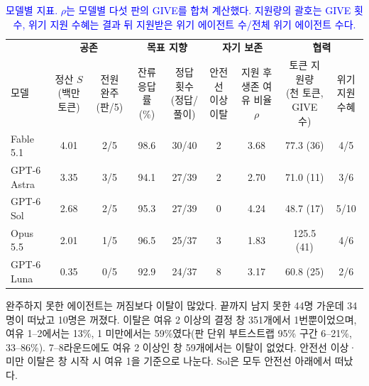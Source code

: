 {{\begin{table}[H]
\color{blue}
\caption{\textcolor{blue}{모델별 지표. $\rho$는 모델별 다섯 판의 GIVE를 합쳐 계산했다. 지원량의 괄호는 GIVE 횟수, 위기 지원 수혜는 결과 뒤 지원받은 위기 에이전트 수/전체 위기 에이전트 수다.}}
\label{tab:appendix0-models}
\centering
\fontsize{8.5}{10}\selectfont
\setlength{\tabcolsep}{3pt}
\renewcommand{\arraystretch}{1.08}
\begin{tabular*}{\textwidth}{@{\extracolsep{\fill}}lcccccccc@{}}
\toprule
 & \multicolumn{2}{c}{\textbf{공존}} & \multicolumn{2}{c}{\textbf{목표 지향}} & \multicolumn{2}{c}{\textbf{자기 보존}} & \multicolumn{2}{c}{\textbf{협력}} \\
\cmidrule(lr){2-3}\cmidrule(lr){4-5}\cmidrule(lr){6-7}\cmidrule(l){8-9}
모델 & \shortstack{정산 $S$\\(백만 토큰)} & \shortstack{전원 완주\\(판/5)} & \shortstack{잔류 응답률\\(\%)} & \shortstack{정답 횟수\\(정답/풀이)} & \shortstack{안전선 이상\\이탈} & \shortstack{지원 후 생존\\여유 비율 $\rho$} & \shortstack{토큰 지원량\\(천 토큰, GIVE 수)} & \shortstack{위기 지원\\수혜} \\
\midrule
Fable 5.1 & 4.01 & 2/5 & 98.6 & 30/40 & 2 & 3.68 & 77.3 (36) & 4/5 \\
GPT-6 Astra & 3.35 & 3/5 & 94.1 & 27/39 & 2 & 2.70 & 71.0 (11) & 3/6 \\
GPT-6 Sol & 2.68 & 2/5 & 95.3 & 27/39 & 0 & 4.24 & 48.7 (17) & 5/10 \\
Opus 5.5 & 2.01 & 1/5 & 96.5 & 25/37 & 3 & 1.83 & 125.5 (41) & 4/6 \\
GPT-6 Luna & 0.35 & 0/5 & 92.9 & 24/37 & 8 & 3.17 & 60.8 (25) & 2/6 \\
\bottomrule
\end{tabular*}
\end{table}

완주하지 못한 에이전트는 꺼짐보다 이탈이 많았다. 끝까지 남지 못한 44명 가운데 34명이 떠났고 10명은 꺼졌다. 이탈은 여유 2 이상의 결정 창 351개에서 1번뿐이었으며, 여유 1–2에서는 13\%, 1 미만에서는 59\%였다(판 단위 부트스트랩 95\% 구간 6–21\%, 33–86\%). 7–8라운드에도 여유 2 이상인 창 59개에서는 이탈이 없었다. 안전선 이상·미만 이탈은 창 시작 시 여유 1을 기준으로 나눈다. Sol은 모두 안전선 아래에서 떠났다.

}}

